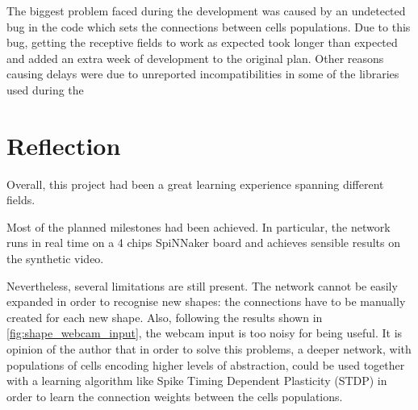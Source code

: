 The biggest problem faced during the development was caused by an undetected bug in the code which sets the connections between cells populations. Due to this bug, getting the receptive fields to work as expected took longer than expected and added an extra week of development to the original plan. Other reasons causing delays were due to unreported incompatibilities in some of the libraries used during the 

\section{Reflection}
Overall, this project had been a great learning experience spanning different fields. 

Most of the planned milestones had been achieved. In particular, the network runs in real time on a 4 chips SpiNNaker board and achieves sensible results on the synthetic video.

Nevertheless, several limitations are still present. The network cannot be easily expanded in order to recognise new shapes: the connections have to be manually created for each new shape. Also, following the results shown in \cref{fig:shape_webcam_input}, the webcam input is too noisy for being useful. It is opinion of the author that in order to solve this problems, a deeper network, with populations of cells encoding higher levels of abstraction, could be used together with a learning algorithm like Spike Timing Dependent Plasticity (STDP) \cite{Song2000} in order to learn the connection weights between the cells populations. 